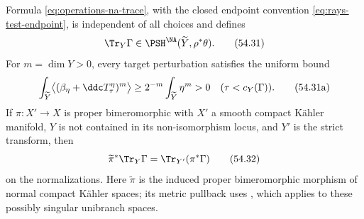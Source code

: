 \par\noindent\begin{minipage}{\textwidth}
\begin{proposition}\label{prop:operations-na-trace}
Formula \eqref{eq:operations-na-trace}, with the closed endpoint
convention \eqref{eq:rays-test-endpoint}, is independent of all choices
and defines
\[
 \Tr_Y\Gamma\in
 \PSH^{\NA}(\widetilde Y,\rho^*\theta).
\tag{54.31}\label{eq:operations-na-trace-target}
\]
For $m=\dim Y>0$, every target perturbation satisfies the uniform bound
\[
 \int_{\widetilde Y}
 \bigl\langle(\beta_\eta+\ddc T_\tau^\eta)^m\bigr\rangle
 \geq 2^{-m}\int_{\widetilde Y}\eta^m>0
 \quad(\tau<c_Y(\Gamma)).
\tag{54.31a}\label{eq:operations-na-trace-mass-floor}
\]
If $\pi:X'\to X$ is proper bimeromorphic with $X'$ a smooth compact
K\"ahler manifold, $Y$ is not contained in its non-isomorphism locus,
and $Y'$ is the strict transform, then
\[
 \widetilde\pi^*\Tr_Y\Gamma
 =\Tr_{Y'}(\pi^*\Gamma)
\tag{54.32}\label{eq:operations-na-trace-birational}
\]
on the normalizations.  Here $\widetilde\pi$ is the induced proper
bimeromorphic morphism of normal compact K\"ahler spaces; its metric
pullback uses \cite[Section~4.8]{XiaOperationsV3}, which applies to
these possibly singular unibranch spaces.
\end{proposition}
\end{minipage}\par\medskip

